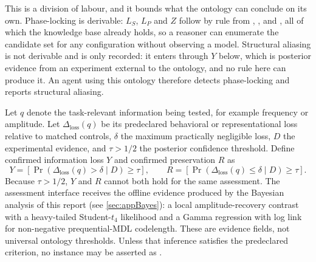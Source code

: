 This is a division of labour, and it bounds what the ontology can conclude on its own. Phase-locking is derivable: $L_S$, $L_P$ and $Z$ follow by rule from , ,  and , all of which the knowledge base already holds, so a reasoner can enumerate the candidate set for any configuration without observing a model. Structural aliasing is not derivable and is only recorded: it enters through $Y$ below, which is posterior evidence from an experiment external to the ontology, and no rule here can produce it. An agent using this ontology therefore detects phase-locking and reports structural aliasing.

Let $q$ denote the task-relevant information being tested, for example frequency or amplitude. Let $\Delta_{\mathrm{loss}}(q)$ be its predeclared behavioral or representational loss relative to matched controls, $\delta$ the maximum practically negligible loss, $D$ the experimental evidence, and $\tau>1/2$ the posterior confidence threshold. Define confirmed information loss $Y$ and confirmed preservation $R$ as
\begin{equation}
Y=\left[\Pr\!\left(\Delta_{\mathrm{loss}}(q)>\delta\mid D\right)\geq\tau\right],
\qquad
R=\left[\Pr\!\left(\Delta_{\mathrm{loss}}(q)\leq\delta\mid D\right)\geq\tau\right].
\label{eq:bayesian-evidence}
\end{equation}
Because $\tau>1/2$, $Y$ and $R$ cannot both hold for the same assessment. The assessment interface receives the offline evidence produced by the Bayesian analysis of this report (see \autoref{sec:appBayes}): a local amplitude-recovery contrast with a heavy-tailed Student-$t_4$ likelihood and a Gamma regression with log link for non-negative prequential-MDL codelength. These are evidence fields, not universal ontology thresholds. Unless that inference satisfies the predeclared criterion, no instance may be asserted as .

